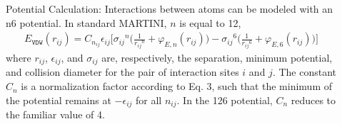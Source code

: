 \documentclass[letterpaper,10pt,english]{sphinxmanual}
\begin{document}
\begin{description}
\item[{}] \leavevmode
Potential Calculation: Interactions between atoms can be modeled with an n\sphinxhyphen{}6 potential. In standard MARTINI, \(n\) is equal to 12,
\begin{equation*}
\begin{split}E_{\texttt{VDW}}(r_{ij}) = C_{n_{ij}}\epsilon_{ij} \Bigg[ {\sigma_{ij}}^{n} \bigg(\frac{1}{{r_{ij}}^{n}} + \varphi_{E, n} (r_{ij}) \bigg) - {\sigma_{ij}}^{6} \bigg(\frac{1}{{r_{ij}}^{6}} + \varphi_{E, 6} (r_{ij}) \bigg) \Bigg]\end{split}
\end{equation*}
where \(r_{ij}\), \(\epsilon_{ij}\), and \(\sigma_{ij}\) are, respectively, the separation, minimum potential, and collision diameter for the pair of interaction sites \(i\) and \(j\). The constant \(C_n\) is a normalization factor according to Eq. 3, such that the minimum of the potential remains at \(-\epsilon_{ij}\) for all \(n_{ij}\). In the 12\sphinxhyphen{}6 potential, \(C_n\) reduces to the familiar value of 4.


\end{description}
\end{document}
